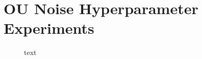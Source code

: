 \section{OU Noise Hyperparameter Experiments}

\begin{figure}[h]
	\centering
	
	\caption{text}
\end{figure}


